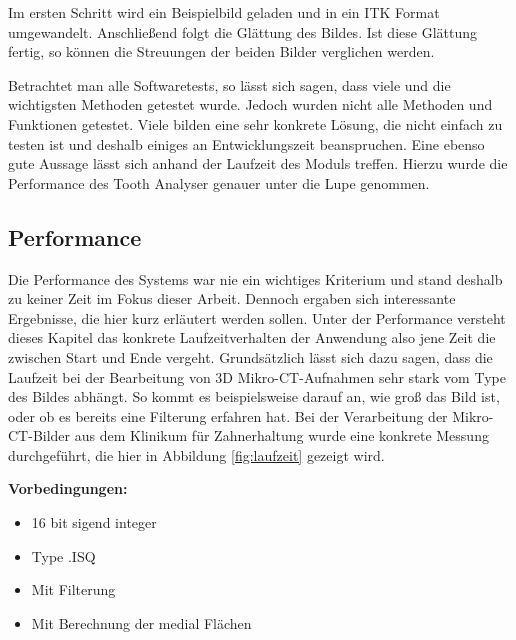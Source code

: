 Im ersten Schritt wird ein Beispielbild geladen und in ein \ac{ITK} Format
umgewandelt. Anschließend folgt die Glättung des Bildes. Ist diese Glättung
fertig, so können die Streuungen der beiden Bilder verglichen werden.

Betrachtet man alle Softwaretests, so lässt sich sagen, dass viele und die wichtigsten
Methoden getestet wurde. Jedoch wurden nicht alle Methoden und Funktionen
getestet. Viele bilden eine sehr konkrete Lösung, die nicht einfach zu testen
ist und deshalb einiges an Entwicklungszeit beanspruchen. Eine ebenso gute Aussage
lässt sich anhand der Laufzeit des Moduls treffen. Hierzu wurde die Performance
des Tooth Analyser genauer unter die Lupe genommen.

\pagebreak

\subsection{Performance}
Die Performance des Systems war nie ein wichtiges Kriterium und stand deshalb zu
keiner Zeit im Fokus dieser Arbeit. Dennoch ergaben sich interessante Ergebnisse,
die hier kurz erläutert werden sollen. Unter der Performance versteht dieses
Kapitel das konkrete Laufzeitverhalten der Anwendung also jene Zeit die zwischen
Start und Ende vergeht. Grundsätzlich lässt sich dazu sagen, dass die Laufzeit
bei der Bearbeitung von 3D Mikro-\ac{CT}-Aufnahmen sehr stark vom Type des Bildes
abhängt. So kommt es beispielsweise darauf an, wie groß das Bild ist, oder ob es
bereits eine Filterung erfahren hat. Bei der Verarbeitung der Mikro-\ac{CT}-Bilder
aus dem Klinikum für Zahnerhaltung wurde eine konkrete Messung durchgeführt, die
hier in Abbildung \ref{fig:laufzeit} gezeigt wird.

\textbf{Vorbedingungen:}
\begin{itemize}
	\item 16 bit sigend integer

	\item Type .ISQ

	\item Mit Filterung

	\item Mit Berechnung der medial Flächen
\end{itemize}

